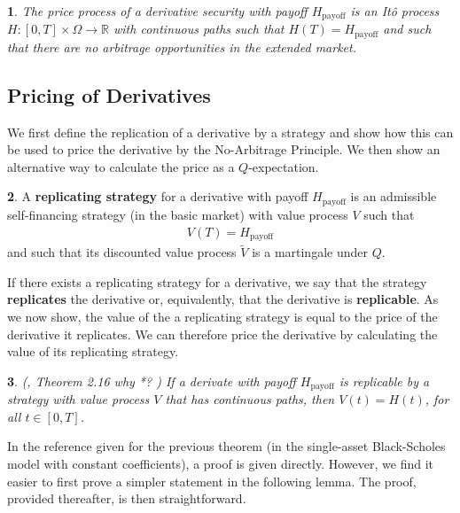 \documentclass[english]{article}
\newcommand{\comment}[1]{\color{blue}#1\color{black}}
\numberwithin{equation}{section}
\numberwithin{figure}{section}
\theoremstyle{bolddescit}
\newtheorem{theorem}{\protect\theoremname}[section]
\theoremstyle{definition}
\newtheorem{definition}[theorem]{\protect\definitionname}
\theoremstyle{definition}
\theoremstyle{plain}
\theoremstyle{plain}
\theoremstyle{bolddesc}
\newtheorem{assumption}[theorem]{\protect\assumptionname}
\theoremstyle{plain}
\theoremstyle{remark}
\providecommand{\assumptionname}{Assumption}
\providecommand{\definitionname}{Definition}
\providecommand{\theoremname}{Theorem}
\begin{document}
\begin{assumption}\label{ass:bs-derivative-regularity}
  The price process of a derivative security with payoff $H_\text{payoff}$ is an It\^o process $H : [0,T] \times \Omega \to \mathbb{R}$ with continuous paths such that $H(T) = H_\text{payoff}$ and such that there are no arbitrage opportunities in the extended market.
\end{assumption}

\subsection{Pricing of Derivatives}

We first define the replication of a derivative by a strategy and show how this can be used to price the derivative by the No-Arbitrage Principle. We then show an alternative way to calculate the price as a $Q$-expectation.

\begin{definition}
  A \textbf{replicating strategy} for a derivative with payoff $H_\text{payoff}$ is an admissible self-financing strategy (in the basic market) with value process $V$ such that
  \begin{align*}
    V(T) = H_\text{payoff}
  \end{align*}
  and such that its discounted value process $\widetilde{V}$ is a martingale under $Q$.
\end{definition}

If there exists a replicating strategy for a derivative, we say that the strategy \textbf{replicates} the derivative or, equivalently, that the derivative is \textbf{replicable}. As we now show, the value of the a replicating strategy is equal to the price of the derivative it replicates. We can therefore price the derivative by calculating the value of its replicating strategy.

\begin{theorem}\label{thm:bs-repl-strat-derivative-prices}
  (\cite{capinski_blackscholes_2012}, Theorem 2.16 
\comment{why *?}
  )
  If a derivate with payoff $H_\text{payoff}$ is replicable by a strategy with value process $V$ that has continuous paths, then $V(t) = H(t)$, for all $t \in [0,T]$.
\end{theorem}

In the reference given for the previous theorem (in the single-asset Black-Scholes model with constant coefficients), a proof is given directly. However, we find it easier to first prove a simpler statement in the following lemma. The proof, provided thereafter, is then straightforward.
\end{document}
